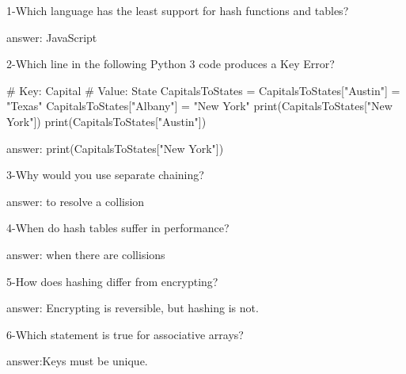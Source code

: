1-Which language has the least support for hash functions and tables?

answer: JavaScript

2-Which line in the following Python 3 code produces a Key Error?

# Key: Capital
# Value: State
CapitalsToStates = {}
CapitalsToStates["Austin"] = "Texas"
CapitalsToStates["Albany"] = "New York"
print(CapitalsToStates["New York"])
print(CapitalsToStates["Austin"])

answer: print(CapitalsToStates["New York"])

3-Why would you use separate chaining?


answer: to resolve a collision

4-When do hash tables suffer in performance?

answer: when there are collisions

5-How does hashing differ from encrypting?

answer: Encrypting is reversible, but hashing is not.

6-Which statement is true for associative arrays?

answer:Keys must be unique.
